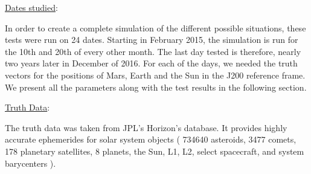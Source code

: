 \underline{Dates studied}:

In order to create a complete simulation of the different possible situations, these tests were run on 24 dates. Starting in February 2015, the simulation is run for the 10th and 20th of every other month. The last day tested is therefore, nearly two years later in December of 2016. For each of the days, we needed the truth vectors for the positions of Mars, Earth and the Sun in the J200 reference frame. We present all the parameters along with the test results in the following section.

\underline{Truth Data}:

The truth data was taken from JPL's Horizon's database. It provides highly accurate ephemerides for solar system objects ( 734640 asteroids, 3477 comets, 178 planetary satellites, 8 planets, the Sun, L1, L2, select spacecraft, and system barycenters ). 
